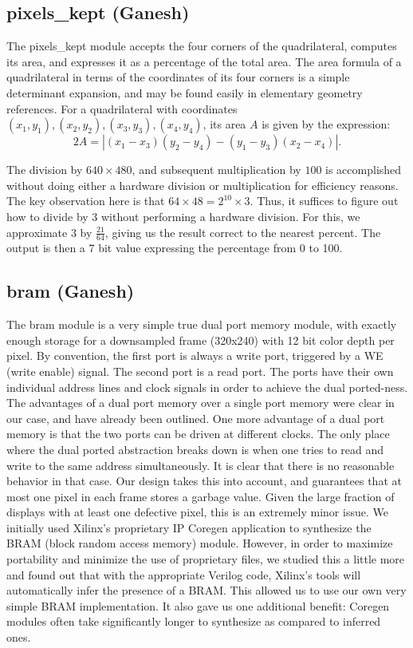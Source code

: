 \documentclass{article}
\begin{document}
\subsection{pixels\_kept (Ganesh)}
The pixels\_kept module accepts the four corners of the quadrilateral, computes its area, and expresses it as a percentage of the total area.
The area formula of a quadrilateral in terms of the coordinates of its four corners is a simple determinant expansion,
and may be found easily in elementary geometry references.
For a quadrilateral with coordinates $(x_1, y_1), (x_2, y_2), (x_3, y_3), (x_4, y_4)$, its area $A$ is given by the expression:
\begin{equation}
    2A = | (x_1 - x_3)(y_2 - y_4) - (y_1 - y_3)(x_2 - x_4) |.
\end{equation}

The division by $640 \times 480$,
and subsequent multiplication by $100$ is accomplished without doing either a hardware division or multiplication for efficiency reasons.
The key observation here is that $64 \times 48 = 2^{10} \times 3$.
Thus, it suffices to figure out how to divide by $3$ without performing a hardware division.
For this, we approximate $3$ by $\frac{21}{64}$, giving us the result correct to the nearest percent.
The output is then a 7 bit value expressing the percentage from 0 to 100.

\subsection{bram (Ganesh)}
The bram module is a very simple true dual port memory module,
with exactly enough storage for a downsampled frame (320x240) with 12 bit color depth per pixel.
By convention, the first port is always a write port, triggered by a WE (write enable) signal.
The second port is a read port.
The ports have their own individual address lines and clock signals in order to achieve the dual ported-ness.
The advantages of a dual port memory over a single port memory were clear in our case, and have already been outlined.
One more advantage of a dual port memory is that the two ports can be driven at different clocks.
The only place where the dual ported abstraction breaks down is when one tries to read and write to the same address simultaneously.
It is clear that there is no reasonable behavior in that case.
Our design takes this into account, and guarantees that at most one pixel in each frame stores a garbage value.
Given the large fraction of displays with at least one defective pixel, this is an extremely minor issue.
We initially used Xilinx's proprietary IP Coregen application to synthesize the BRAM (block random access memory) module.
However, in order to maximize portability and minimize the use of proprietary files,
we studied this a little more and found out that with the appropriate Verilog code, Xilinx's tools will automatically infer the presence of a BRAM.
This allowed us to use our own very simple BRAM implementation.
It also gave us one additional benefit: Coregen modules often take significantly longer to synthesize as compared to inferred ones.
\end{document}
